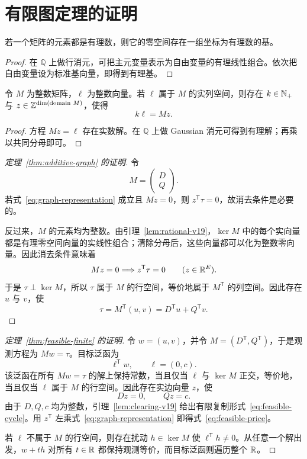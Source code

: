 \appendix

\section{有限图定理的证明}
\label{app:finite-proof}

\begin{lemma}[有理零空间基]
\label{lem:rational-v19}
若一个矩阵的元素都是有理数，则它的零空间存在一组坐标为有理数的基。
\end{lemma}

\begin{proof}
在 $\mathbb Q$ 上做行消元，可把主元变量表示为自由变量的有理线性组合。依次把自由变量设为标准基向量，即得到有理基。
\end{proof}

\begin{lemma}[清除分母]
\label{lem:clearing-v19}
令 $M$ 为整数矩阵，$\ell$ 为整数向量。若 $\ell$ 属于 $M$ 的实列空间，则存在 $k\in\mathbb N_+$ 与 $z\in\mathbb Z^{\dim(\text{domain }M)}$，使得
\[
k\ell=Mz.
\]
\end{lemma}

\begin{proof}
方程 $Mz=\ell$ 存在实数解。在 $\mathbb Q$ 上做 Gaussian 消元可得到有理解；再乘以共同分母即可。
\end{proof}

\begin{proof}[定理~\ref{thm:additive-graph} 的证明]
令
\[
M=
\begin{pmatrix}
D\\Q
\end{pmatrix}.
\]
若式~\eqref{eq:graph-representation} 成立且 $Mz=0$，则 $z^{\mathsf T}\tau=0$，故消去条件是必要的。

反过来，$M$ 的元素均为整数。由引理~\ref{lem:rational-v19}，$\ker M$ 中的每个实向量都是有理零空间向量的实线性组合；清除分母后，这些向量都可以化为整数零向量。因此消去条件意味着
\[
Mz=0\Longrightarrow z^{\mathsf T}\tau=0
\qquad(z\in\mathbb R^E).
\]
于是 $\tau\perp\ker M$，所以 $\tau$ 属于 $M$ 的行空间，等价地属于 $M^{\mathsf T}$ 的列空间。因此存在 $u$ 与 $v$，使
\[
\tau=M^{\mathsf T}(u,v)=D^{\mathsf T}u+Q^{\mathsf T}v.
\]
\end{proof}

\begin{proof}[定理~\ref{thm:feasible-finite} 的证明]
令 $w=(u,v)$，并令 $M=(D^{\mathsf T},Q^{\mathsf T})$，于是观测方程为 $Mw=\tau$。目标泛函为
\[
\ell^{\mathsf T}w,
\qquad
\ell=(0,c).
\]
该泛函在所有 $Mw=\tau$ 的解上保持常数，当且仅当 $\ell$ 与 $\ker M$ 正交，等价地，当且仅当 $\ell$ 属于 $M$ 的行空间。因此存在实边向量 $z$，使
\[
Dz=0,
\qquad
Qz=c.
\]
由于 $D,Q,c$ 均为整数，引理~\ref{lem:clearing-v19} 给出有限复制形式~\eqref{eq:feasible-cycle}。用 $z^{\mathsf T}$ 左乘式~\eqref{eq:graph-representation} 即得式~\eqref{eq:feasible-price}。

若 $\ell$ 不属于 $M$ 的行空间，则存在扰动 $h\in\ker M$ 使 $\ell^{\mathsf T}h\ne0$。从任意一个解出发，$w+th$ 对所有 $t\in\mathbb R$ 都保持观测等价，而目标泛函则遍历整个 $\mathbb R$。
\end{proof}
